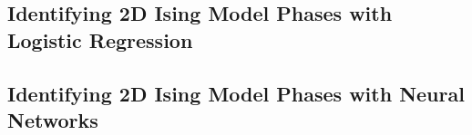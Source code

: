 \subsection{Identifying 2D Ising Model Phases with Logistic Regression}\label{sec:results logreg}

\subsection{Identifying 2D Ising Model Phases with Neural Networks}\label{sec:results NN}
